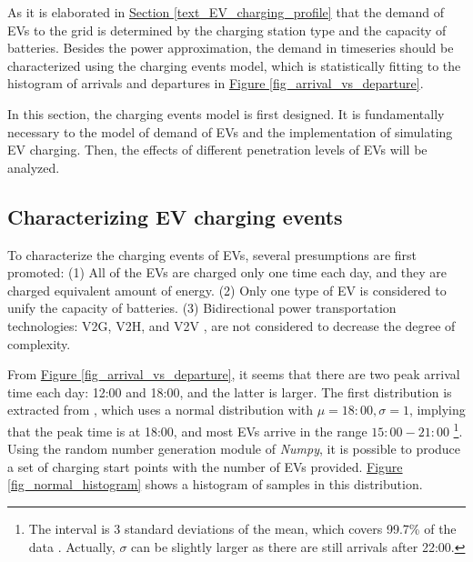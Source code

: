 \documentclass[12pt,a4paper]{report}
\begin{document}
            As it is elaborated in \hyperref[text_EV_charging_profile]{Section \ref*{text_EV_charging_profile}} that the demand of EVs to the grid is determined by the charging station type and the capacity of batteries. Besides the power approximation, the demand in timeseries should be characterized using the charging events model, which is statistically fitting to the histogram of arrivals and departures in \hyperref[fig_arrival_vs_departure]{Figure \ref*{fig_arrival_vs_departure}}.

            In this section, the charging events model is first designed. It is fundamentally necessary to the model of demand of EVs and the implementation of simulating EV charging. Then, the effects of different penetration levels of EVs will be analyzed.

                \subsection{Characterizing EV charging events}
                \label{text_ev_charging_model}
                To characterize the charging events of EVs, several presumptions are first promoted: (1) All of the EVs are charged only one time each day, and they are charged equivalent amount of energy. (2) Only one type of EV is considered to unify the capacity of batteries. (3) Bidirectional power transportation technologies: V2G, V2H, and V2V \cite{paper:v2g}, are not considered to decrease the degree of complexity.

                From \hyperref[fig_arrival_vs_departure]{Figure \ref*{fig_arrival_vs_departure}}, it seems that there are two peak arrival time each day: 12:00 and 18:00, and the latter is larger. The first distribution is extracted from \cite{paper:Shao2010}, which uses a normal distribution with $\mu = 18:00, \sigma = 1$, implying that the peak time is at 18:00, and most EVs arrive in the range $15:00 - 21:00$ \footnote{The interval is 3 standard deviations of the mean, which covers 99.7\% of the data \cite{website:normaldistribution}. Actually, $\sigma$ can be slightly larger as there are still arrivals after 22:00.}.
                Using the random number generation module of \emph{Numpy}, it is possible to produce a set of charging start points with the number of EVs provided. \hyperref[fig_normal_histogram]{Figure \ref*{fig_normal_histogram}} shows a histogram of samples in this distribution.
\end{document}

